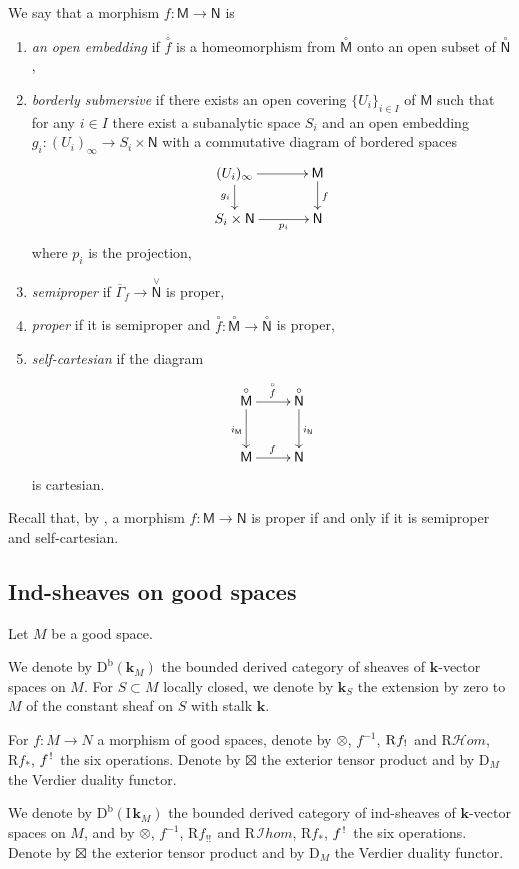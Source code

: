 \documentclass[11pt]{article}
\numberwithin{equation}{section}
\let\mathcal\mathscr
\newenvironment{enumeratei}
{\bgroup\def\theenumi{\roman{enumi}}\def\theenumii{\alph{enumii}}\begin{enumerate}}
{\end{enumerate}\egroup}
\let\cl\colon
\newcommand{\accentset}[2]{\overset{#1}{#2}}
\theoremstyle{plain}
\theoremstyle{definition}
\newcommand{\derived}[1]{\mathrm{#1}}
\newcommand{\derd}{\derived{D}}
\newcommand{\derr}{\derived{R}}
\newcommand{\BDC}{\derd^{\mathrm{b}}}
\newcommand{\roim}[1]{\derr#1_*}
\newcommand{\reim}[1]{\derr#1_{\mspace{.5mu}!}\mspace{2mu}}
\newcommand{\reeim}[1]{\derr#1_{\mspace{1mu}!!}\mspace{1mu}}
\newcommand{\rhom}{{\derr\sheaffont{H}\!om}}
\newcommand{\rihom}{{\derr\mspace{2mu}\shi\!hom}}
\newcommand{\epb}[1]{#1^{\mspace{1.5mu}!}\mspace{2mu}}
\newcommand{\etens}[1][]{\mathbin{\boxtimes_{\raise1.5ex\hbox to-.1em{}#1}}}
\newcommand{\sheaffont}[1]{\mathcal{#1}}
\newcommand\shi{\sheaffont{I}}
\newcommand{\dual}{\mathrm{D}}
\newcommand{\field}{\mathbf{k}}\let\cor\field
\newcommand{\ind}{\mathrm{I}\mspace{2mu}}
\newcommand{\ifield}{\ind\field}
\newcommand{\bclose}[1]{{\accentset{\vee}{#1}}}\let\cc\bclose
\newcommand{\unbordered}[1]{{\accentset{\circ}{#1}}}
\let\oo \unbordered
\newcommand{\inbordered}[1]{{#1_\infty}}
\let\inb \inbordered
\newcommand{\bbM}{\mathsf{M}}
\newcommand{\obM}{\unbordered{\bbM}}
\newcommand{\bbN}{\mathsf{N}}
\newcommand{\obN}{\unbordered{\bbN}}
\newcommand{\cbN}{\bclose{\bbN}}
\newcommand{\tens}[1][]{\mathbin{\otimes_{\raise1.5ex\hbox to-.1em{}#1}}}
\newcommand{\st}[1]{{\{{#1}\}}}
\newcommand{\opb}[1]{#1^{-1}}
\begin{document}
We say that a morphism $f\colon\bbM\to\bbN$ is
\begin{enumeratei}
\item \emph{an open embedding} if
$\oo f$ is a homeomorphism from $\obM$ onto an open subset of $\obN$,
\item
\emph{borderly submersive} if
there exists an open covering $\st{U_i}_{i\in I}$ of $\bbM$
such that for any $i\in I$ there exist
a subanalytic space $S_i$ and an open embedding
$g_i\cl\inb{(U_i)}\to S_i\times\bbN$
with
a commutative diagram of bordered spaces
\[\xymatrix@C=8ex@R=4ex{\inb{(U_i)}\ar[r]\ar[d]_{g_i}&\bbM\ar[d]^f\\
S_i\times\bbN\ar[r]_--{p_i}&\bbN}\]
where $p_i$ is the projection,
\item
\emph{semiproper} if $\overline\Gamma_f\to \cbN$ is proper,
\item
\emph{proper} if it is semiproper and $\oo f\colon \obM\to \obN$ is proper,
\item
\emph{self-cartesian} if the diagram
\[
\xymatrix{
\obM \ar[r]^{\oo f} \ar[d]_{i_\bbM} & \obN \ar[d]^{i_\bbN} \\
\bbM \ar[r]^f & \bbN
}
\]
is cartesian.
\end{enumeratei}

Recall that, by \cite[Lem.\,3.3.16]{DK16}, a morphism $f\colon\bbM\to\bbN$ is proper if and only if it is semiproper and self-cartesian.

\subsection{Ind-sheaves on good spaces}\label{sse:indingood}

Let $M$ be a good space.

We denote by $\BDC(\field_M)$ the bounded derived category of sheaves of $\field$-vector spaces on $M$.
For $S\subset M$ locally closed, we denote by $\field_S$ the extension by zero to $M$ of the constant sheaf on $S$ with stalk $\field$.

For $f\colon M\to N$ a morphism of good spaces, denote by $\tens$, $\opb f$, $\reim f$ and $\rhom$, $\roim f$, $\epb f$ the six operations.
Denote by $\etens$ the exterior tensor product and by $\dual_M$ the Verdier duality functor.

We denote by $\BDC(\ifield_M)$ the bounded derived category of ind-sheaves of $\field$-vector spaces on $M$, and by $\tens$, $\opb f$, $\reeim f$ and $\rihom$, $\roim f$, $\epb f$ the six operations.
Denote by $\etens$ the exterior tensor product and by $\dual_M$ the Verdier duality functor.
\end{document}
